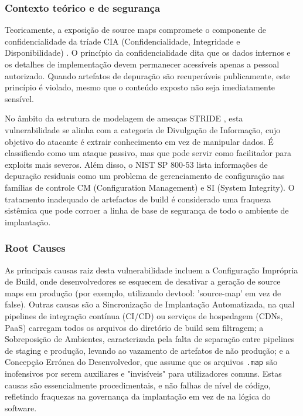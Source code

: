 \subsubsection{Contexto teórico e de segurança}

Teoricamente, a exposição de source maps compromete o componente de confidencialidade da tríade CIA (Confidencialidade, Integridade e Disponibilidade) \cite{ref47}. O princípio da confidencialidade dita que os dados internos e os detalhes de implementação devem permanecer acessíveis apenas a pessoal autorizado. Quando artefatos de depuração são recuperáveis publicamente, este princípio é violado, mesmo que o conteúdo exposto não seja imediatamente sensível. 

No âmbito da estrutura de modelagem de ameaças STRIDE \cite{ref44}, esta vulnerabilidade se alinha com a categoria de Divulgação de Informação, cujo objetivo do atacante é extrair conhecimento em vez de manipular dados. É classificado como um ataque passivo, mas que pode servir como facilitador para exploits mais severos. Além disso, o NIST SP 800-53 \cite{ref3} lista informações de depuração residuais como um problema de gerenciamento de configuração nas famílias de controle CM (Configuration Management) e SI (System Integrity). O tratamento inadequado de artefactos de build é considerado uma fraqueza sistêmica que pode corroer a linha de base de segurança de todo o ambiente de implantação. 

\subsubsection{Root Causes}

As principais causas raiz desta vulnerabilidade incluem a Configuração Imprópria de Build, onde desenvolvedores se esquecem de desativar a geração de source maps em produção (por exemplo, utilizando devtool: 'source-map' em vez de false). Outras causas são a Sincronização de Implantação Automatizada, na qual pipelines de integração contínua (CI/CD) ou serviços de hospedagem (CDNs, PaaS) carregam todos os arquivos do diretório de build sem filtragem; a Sobreposição de Ambientes, caracterizada pela falta de separação entre pipelines de staging e produção, levando ao vazamento de artefatos de não produção; e a Concepção Errónea do Desenvolvedor, que assume que os arquivos \texttt{.map} são inofensivos por serem auxiliares e "invisíveis" para utilizadores comuns. Estas causas são essencialmente procedimentais, e não falhas de nível de código, refletindo fraquezas na governança da implantação em vez de na lógica do software. \cite{ref8}

